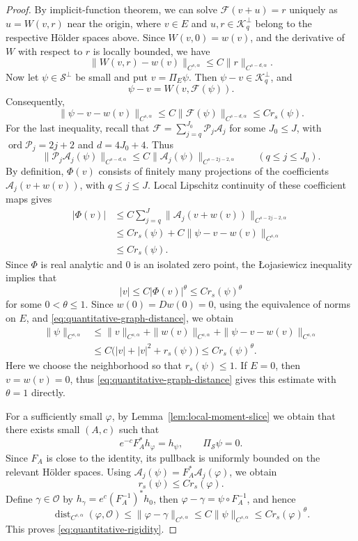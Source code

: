 \documentclass[11pt,reqno]{amsart}
\theoremstyle{corollary}
\theoremstyle{conjecture}
\theoremstyle{assumption}
\theoremstyle{proposition}
\theoremstyle{remark}
\numberwithin{equation}{section}
\begin{document}
\begin{proof}
By implicit-function theorem, we can solve $\mathcal F(v+u)=r$ uniquely as $u=W(v,r)$ near the origin, where $v\in E$ and $u,r\in\mathcal K_q^\perp$ belong to the respective H\"older spaces above. Since $W(v,0)=w(v)$, and the derivative of $W$ with respect to $r$ is locally bounded, we have
\[
\|W(v,r)-w(v)\|_{C^{s,\alpha}}\leq C\|r\|_{C^{s-d,\alpha}}.
\]
Now let $\psi\in\mathcal S^\perp$ be small and put $v=\Pi_E\psi$. Then $\psi-v\in\mathcal K_q^\perp$, and
\[
\psi-v=W(v,\mathcal F(\psi)).
\]
Consequently,
\begin{equation}\label{eq:quantitative-graph-distance}
\|\psi-v-w(v)\|_{C^{s,\alpha}}\leq C\|\mathcal F(\psi)\|_{C^{s-d,\alpha}}\leq Cr_s(\psi).
\end{equation}
For the last inequality, recall that $\mathcal F=\sum_{j=q}^{J_0}\mathcal P_j\mathcal A_j$ for some $J_0\leq J$, with $\operatorname{ord}\mathcal P_j=2j+2$ and $d=4J_0+4$. Thus
\[
\|\mathcal P_j\mathcal A_j(\psi)\|_{C^{s-d,\alpha}}\leq C\|\mathcal A_j(\psi)\|_{C^{s-2j-2,\alpha}}\qquad(q\leq j\leq J_0).
\]
By definition, $\Phi(v)$ consists of finitely many projections of the coefficients $\mathcal A_j(v+w(v))$, with $q\leq j\leq J$. Local Lipschitz continuity of these coefficient maps gives
\[
\begin{aligned}
|\Phi(v)|
&\leq C\sum_{j=q}^{J}\|\mathcal A_j(v+w(v))\|_{C^{s-2j-2,\alpha}}\\
&\leq Cr_s(\psi)+C\|\psi-v-w(v)\|_{C^{s,\alpha}}\\
&\leq Cr_s(\psi).
\end{aligned}
\]
Since $\Phi$ is real analytic and $0$ is an isolated zero point, the \L{}ojasiewicz inequality \cite[Remark~6.5]{BierstoneMilman1988} implies that
\[
|v|\leq C|\Phi(v)|^\theta\leq Cr_s(\psi)^\theta
\]
for some $0<\theta\leq1$. Since $w(0)=Dw(0)=0$, using the equivalence of norms on $E$, and \eqref{eq:quantitative-graph-distance}, we obtain
\[
\begin{aligned}
\|\psi\|_{C^{s,\alpha}}&\leq \|v\|_{C^{s,\alpha}}+\|w(v)\|_{C^{s,\alpha}}+\|\psi-v-w(v)\|_{C^{s,\alpha}}\\
&\leq C\bigl(|v|+|v|^2+r_s(\psi)\bigr)\leq Cr_s(\psi)^\theta.
\end{aligned}
\]
Here we choose the neighborhood so that $r_s(\psi)\leq1$. If $E=0$, then $v=w(v)=0$, thus \eqref{eq:quantitative-graph-distance} gives this estimate with $\theta=1$ directly.

For a sufficiently small $\varphi$, by Lemma~\ref{lem:local-moment-slice} we obtain that there exists small $(A,c)$ such that
\[
e^{-c}F_A^*h_\varphi=h_\psi,\qquad\Pi_{\mathcal S}\psi=0.
\]
Since $F_A$ is close to the identity, its pullback is uniformly bounded on the relevant H\"older spaces. Using $\mathcal A_j(\psi)=F_A^*\mathcal A_j(\varphi)$, we obtain
\[
r_s(\psi)\leq Cr_s(\varphi).
\]
Define $\gamma\in\mathcal O$ by $h_\gamma=e^c(F_A^{-1})^*h_0$, then $\varphi-\gamma=\psi\circ F_A^{-1}$, and hence
\[
\operatorname{dist}_{C^{s,\alpha}}(\varphi,\mathcal O)\leq \|\varphi-\gamma\|_{C^{s,\alpha}}\leq C\|\psi\|_{C^{s,\alpha}}\leq Cr_s(\varphi)^\theta.
\]
This proves \eqref{eq:quantitative-rigidity}.
\end{proof}
\end{document}
